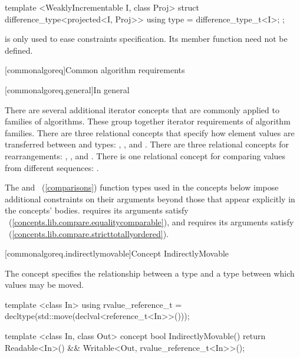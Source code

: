 \begin{addedblock}
\begin{codeblock}
  template <WeaklyIncrementable I, class Proj>
  struct difference_type<projected<I, Proj>> {
    using type = difference_type_t<I>;
  };
\end{codeblock}

\pnum
\enternote {} is only used to ease constraints specification. Its
member function need not be defined.\exitnote

[commonalgoreq]{Common algorithm requirements}

[commonalgoreq.general]{In general}

\pnum
There are several additional iterator concepts that are commonly applied to families of algorithms.
These group together iterator requirements of algorithm families. There are three relational
concepts that specify how element values are transferred between  and  types:
, , and . There are three relational concepts
for rearrangements: , , and .
There is one relational concept for comparing values from different sequences: .

\pnum
\enternote The  and ~(\ref{comparisons}) function types used in the
concepts below impose additional constraints on their arguments beyond those that appear explicitly in the
concepts' bodies.  requires its arguments satisfy ~(\ref{concepts.lib.compare.equalitycomparable}),
and  requires its arguments satisfy ~(\ref{concepts.lib.compare.stricttotallyordered}).\exitnote

[commonalgoreq.indirectlymovable]{Concept IndirectlyMovable}

\pnum
The  concept specifies the relationship between a 
type and a  type between which values may be moved.

%
\begin{codeblock}
  template <class In>
  using rvalue_reference_t =
    decltype(std::move(declval<reference_t<In>>()));

  template <class In, class Out>
  concept bool IndirectlyMovable() {
    return Readable<In>() &&
      Writable<Out, rvalue_reference_t<In>>();
  }
\end{codeblock}


\end{addedblock}
